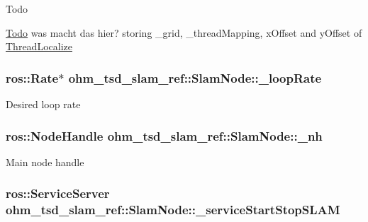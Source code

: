 \begin{DoxyRefDesc}{Todo}
\item[\hyperlink{todo__todo000014}{Todo}]was macht das hier? storing \-\_\-grid, \-\_\-thread\-Mapping, x\-Offset and y\-Offset of \hyperlink{classohm__tsd__slam__ref_1_1ThreadLocalize}{Thread\-Localize} \end{DoxyRefDesc}
\hypertarget{classohm__tsd__slam__ref_1_1SlamNode_a09e9b76d84f565257c0aacda187c82ec}{
\subsubsection[{\-\_\-loop\-Rate}]{\setlength{\rightskip}{0pt plus 5cm}ros\-::\-Rate$\ast$ ohm\-\_\-tsd\-\_\-slam\-\_\-ref\-::\-Slam\-Node\-::\-\_\-loop\-Rate\hspace{0.3cm}{\ttfamily [private]}}}\label{classohm__tsd__slam__ref_1_1SlamNode_a09e9b76d84f565257c0aacda187c82ec}
Desired loop rate \hypertarget{classohm__tsd__slam__ref_1_1SlamNode_a2e2b86d2d3ddff889a33152197e42894}{
\subsubsection[{\-\_\-nh}]{\setlength{\rightskip}{0pt plus 5cm}ros\-::\-Node\-Handle ohm\-\_\-tsd\-\_\-slam\-\_\-ref\-::\-Slam\-Node\-::\-\_\-nh\hspace{0.3cm}{\ttfamily [private]}}}\label{classohm__tsd__slam__ref_1_1SlamNode_a2e2b86d2d3ddff889a33152197e42894}
Main node handle \hypertarget{classohm__tsd__slam__ref_1_1SlamNode_a2941b11fc25f02fad3467297f0260fec}{
\subsubsection[{\-\_\-service\-Start\-Stop\-S\-L\-A\-M}]{\setlength{\rightskip}{0pt plus 5cm}ros\-::\-Service\-Server ohm\-\_\-tsd\-\_\-slam\-\_\-ref\-::\-Slam\-Node\-::\-\_\-service\-Start\-Stop\-S\-L\-A\-M\hspace{0.3cm}{\ttfamily [private]}}}\label{classohm__tsd__slam__ref_1_1SlamNode_a2941b11fc25f02fad3467297f0260fec}
